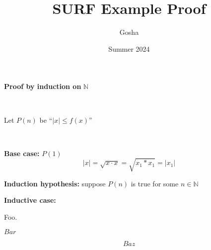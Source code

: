 \documentclass{article}
\title{SURF Example Proof}
\author{Gosha}
\date{Summer 2024}
\begin{document}
\maketitle

\textbf {Proof by induction on} $\mathbb N$

\

Let $P(n)$ be ``$|x| \leq f(x)$''

\

\textbf {Base case:} $P(1)$
$$|x| = \sqrt {x \cdot x} = \sqrt {x_1 * x_1} = |x_1|$$

\textbf {Induction hypothesis:} suppose $P(n)$ is true for some $n \in \mathbb{N}$

\textbf {Inductive case:}

Foo.

$Bar$

$$Baz$$
\end{document}
